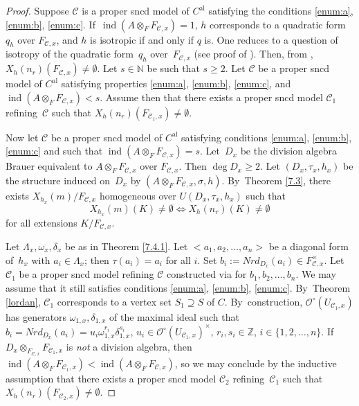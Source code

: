 \documentclass[JEP,XML,SOM,Unicode,NoFloatCountersInSection,published]{cedram}
\newcommand{\al}{\mathrm{al}}
\DeclareMathOperator{\ind}{ind}
\theoremstyle{definition}
\begin{document}
\begin{proof}
Suppose $\mathscr{C}$ is a proper sncd model of $C^{\al}$ satisfying the conditions \eqref{enum:a}, \eqref{enum:b}, \eqref{enum:c}. If~$\ind(A \otimes_F F_{\mathscr{C},x})=1$, $h$ corresponds to a quadratic form $q_h$ over $F_{\mathscr{C},x}$, and $h$ is isotropic if and only if $q$ is. One reduces to a question of isotropy of the quadratic form~$q_h$ over~$F_{\mathscr{C},x}$ (see proof of \cite[Th.\,12.2]{parsur}). Then, from \cite[Cor.\,4.7]{hhk10}, $X_h(n_r)(F_{\mathscr{C},x}) \neq \emptyset$.
Let $s \in \mathbb{N}$ be such that $s \geqslant 2$. Let $\mathscr{C}$ be a proper sncd model of $C^{\al}$ satisfying properties \eqref{enum:a}, \eqref{enum:b}, \eqref{enum:c}, and $\ind(A \otimes_F F_{\mathscr{C},x})< s$. Assume then that there exists a proper sncd model $\mathscr{C}_1$ refining~$\mathscr{C}$ such that $X_h(n_r)(F_{\mathscr{C}_1,x}) \neq \emptyset$.

Now let $\mathscr{C}$ be a proper sncd model of $C^{\al}$ satisfying conditions \eqref{enum:a}, \eqref{enum:b}, \eqref{enum:c} and such that $\ind(A \otimes_F F_{\mathscr{C},x})=s$. Let~$D_x$ be the division algebra Brauer equivalent to $A \otimes_F F_{\mathscr{C},x}$ over $F_{\mathscr{C},x}$. Then ${\deg{D_x} \geqslant 2}$. Let $(D_x, \tau_x, h_x)$ be the structure induced on~$D_x$ by ${(A \otimes_F F_{\mathscr{C},x}, \sigma, h)}$. By~Theorem \ref{7.3}, there exists $X_{h_x}(m)/F_{\mathscr{C},x}$ homogeneous over $\textit{U}(D_x, \tau_x, h_x)$ such that
\[
{X_{h_x}(m)(K) \neq \emptyset} \iff X_h(n_r)(K) \neq \emptyset
\]
for all extensions $K/F_{\mathscr{C},x}$.

Let $\Lambda_x, \omega_x, \delta_x$ be as in Theorem \ref{7.4.1}. Let $<a_1, a_2, \dots, a_n>$ be a diagonal form of~$h_x$ with $a_i \in \Lambda_x$; then $\tau(a_i)=a_i$ for all $i$. Set $b_i:=Nrd_{D_x}(a_i) \in F_{\mathscr{C},x}^{\times}$. Let $\mathscr{C}_1$ be a proper sncd model refining $\mathscr{C}$ constructed via \cite[Lem.\,4.3]{wu} for $b_1, b_2, \dots, b_n$. We may assume that it still satisfies conditions \eqref{enum:a}, \eqref{enum:b}, \eqref{enum:c}. By~Theorem \ref{lordan}, $\mathscr{C}_1$ corresponds to a vertex set $S_1 \supseteq S$ of $C$.
By~construction, $\mathcal{O}^{\circ}(U_{\mathscr{C}_1,x})$ has generators $\omega_{1,x}, \delta_{1,x}$ of the maximal ideal such that $b_i=Nrd_{D_x}(a_i)=u_i \omega_{1,x}^{r_i} \delta_{1,x}^{s_i}$, $u_i \in \mathcal{O}^{\circ}(U_{\mathscr{C}_1,x})^{\times}$, $r_i, s_i \in \mathbb{Z}$, $i \in \{1,2,\dots, n\}$. If $D_x \otimes_{F_{\mathscr{C},x}} F_{\mathscr{C}_1,x}$ is \emph{not} a division algebra, then $\ind(A \otimes_F F_{\mathscr{C}_1,x}) < \ind(A \otimes_F F_{\mathscr{C},x})$, so we may conclude by the inductive assumption that there exists a proper sncd model $\mathscr{C}_2$ refining~$\mathscr{C}_1$ such that $X_h(n_r)(F_{\mathscr{C}_2,x}) \neq \emptyset$.


\end{proof}
\end{document}
